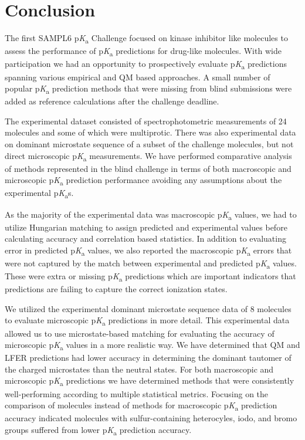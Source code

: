 \documentclass[9pt,lineno,final]{elife}
\newcommand{\pKa}{p\textit{K}\textsubscript{a}}
\begin{document}
\section{Conclusion}

The first SAMPL6 \pKa{} Challenge focused on kinase inhibitor like molecules to assess the performance of \pKa{} predictions for drug-like molecules. With wide participation we had an opportunity to prospectively evaluate \pKa{} predictions spanning various empirical and QM based approaches. A small number of popular \pKa{} prediction methods that were missing from blind submissions were added as reference calculations after the challenge deadline. 

The experimental dataset consisted of spectrophotometric measurements of 24 molecules and some of which were multiprotic. There was also experimental data on dominant microstate sequence of a  subset of the challenge molecules, but not direct microscopic \pKa{} measurements. We have performed comparative analysis of methods represented in the blind challenge in terms of both macroscopic and microscopic \pKa{} prediction performance avoiding any assumptions about the experimental \pKa{}s. 

As the majority of the experimental data was macroscopic \pKa{} values, we had to utilize Hungarian matching to assign predicted and experimental values before calculating accuracy and correlation based statistics. In addition to evaluating error in predicted \pKa{} values, we also reported the macroscopic \pKa{} errors that were not captured by the match between experimental and predicted \pKa{} values. These were extra or missing \pKa{} predictions which are important indicators that predictions are failing to capture the correct ionization states. 

We utilized the experimental dominant microstate sequence data of 8 molecules to evaluate microscopic \pKa{} predictions in more detail. This experimental data allowed us to use microstate-based matching for evaluating the accuracy of microscopic \pKa{} values in a more realistic way. We have determined that QM and LFER predictions had lower accuracy in determining the dominant tautomer of the charged microstates than the neutral states. For both macroscopic and microscopic \pKa{} predictions we have determined methods that were consistently well-performing according to multiple statistical metrics. Focusing on the comparison of molecules instead of methods for macroscopic \pKa{} prediction accuracy indicated molecules with sulfur-containing heterocyles, iodo, and bromo groups suffered from lower \pKa{} prediction accuracy. 
\end{document}
